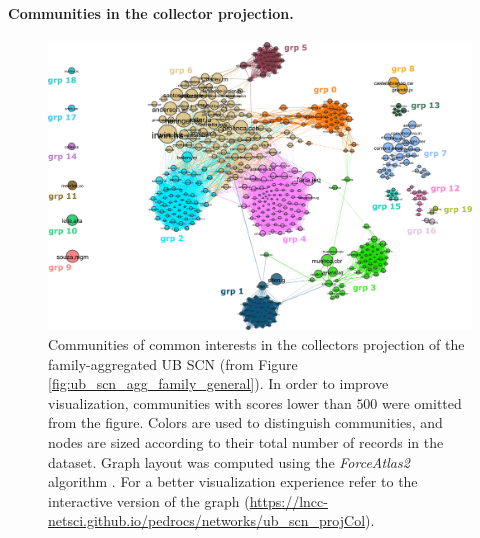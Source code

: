 \paragraph{Communities in the collector projection.}
\begin{figure}[!ht]
  	\centering
    \includegraphics[width=\linewidth]{figures/casestudy_ub/scn_family_projCol_communities.pdf}
    \caption[Communities of common interests in the collector projection of the family-aggregated UB SCN]{ Communities of common interests in the collectors projection of the family-aggregated UB SCN (from Figure \ref{fig:ub_scn_agg_family_general}). In order to improve visualization, communities with scores lower than $500$ were omitted from the figure. Colors are used to distinguish communities, and nodes are sized according to their total number of records in the dataset.
    Graph layout was computed using the \textit{ForceAtlas2} algorithm \cite{Jacomy2014}. For a better visualization experience refer to the interactive version of the graph (\url{https://lncc-netsci.github.io/pedrocs/networks/ub_scn_projCol}).}
    \label{fig:ub_scn_family_projCol_communities}
\end{figure}


